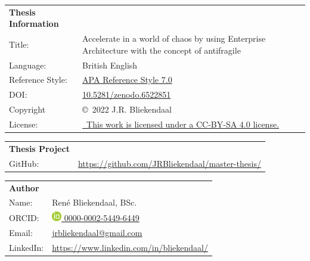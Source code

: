 \thispagestyle{plain}
	\begin{tabular}{p{}p{}}
		\textbf{Thesis Information} & \\
		Title: & Accelerate in a world of chaos by using Enterprise Architecture with the concept of antifragile \\
		Language: & British English \\
		Reference Style: & \href{https://apastyle.apa.org/products/publication-manual-7th-edition}{APA Reference Style 7.0}\\
		DOI: & \href{https://www.doi.org/10.5281/zenodo.6522851/}{10.5281/zenodo.6522851} \\
		Copyright & \copyright\ 2022 J.R. Bliekendaal\\
		License: & \href{https://creativecommons.org/licenses/by-sa/4.0/}{\ccbysa\ This work is licensed under a CC-BY-SA 4.0 license.}\\
	\end{tabular}

\vspace{\baselineskip}

	\begin{tabular}{p{}p{}}
		\textbf{Thesis Project} & \\
		GitHub: & \url{https://github.com/JRBliekendaal/master-thesis/}\\
	\end{tabular}

\vspace{\baselineskip}

	\begin{tabular}{p{}p{}}
		\textbf{Author} & \\
		Name: & René Bliekendaal, BSc. \\
		ORCID: & \href{https://orcid.org/0000-0002-5449-6449/}{\includegraphics[scale=0.45]{images/ORCIDiD_icon} 0000-0002-5449-6449}\\
		Email: & \href{mailto:jrbliekendaal@gmail.com}{jrbliekendaal@gmail.com}\\
		LinkedIn: & \url{https://www.linkedin.com/in/bliekendaal/}\\
	\end{tabular}

\vspace{\baselineskip}

